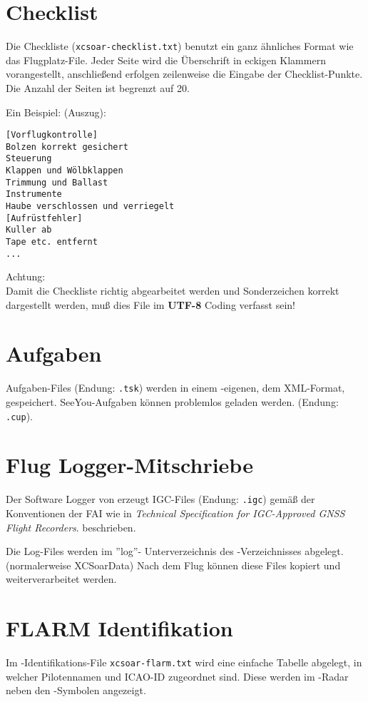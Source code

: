\section{Checklist}

Die Checkliste  (\verb|xcsoar-checklist.txt|) benutzt ein ganz ähnliches Format
wie das Flugplatz-File. 
Jeder Seite wird die Überschrift in eckigen Klammern vorangestellt, anschließend erfolgen
zeilenweise die Eingabe der Checklist-Punkte. Die Anzahl der Seiten ist begrenzt auf 20.

Ein Beispiel: (Auszug):
\begin{verbatim}
[Vorflugkontrolle]
Bolzen korrekt gesichert
Steuerung
Klappen und Wölbklappen
Trimmung und Ballast
Instrumente
Haube verschlossen und verriegelt
[Aufrüstfehler]
Kuller ab
Tape etc. entfernt
...
\end{verbatim}
 Achtung:\\ Damit die Checkliste richtig abgearbeitet werden und Sonderzeichen korrekt dargestellt werden, muß dies File \warning im \textbf{UTF-8} Coding verfasst sein!

\section{Aufgaben }

Aufgaben-Files  (Endung: \verb|.tsk|) werden in einem \xc -eigenen, dem  XML-Format, gespeichert.
SeeYou-Aufgaben können problemlos geladen werden. (Endung: \verb|.cup|).

\section{Flug Logger-Mitschriebe} \label{sec:logfiles}
Der Software Logger von \xc erzeugt  IGC-Files (Endung: \verb|.igc|)
gemäß der Konventionen der FAI wie in  {\em Technical Specification for IGC-Approved GNSS Flight Recorders}.
beschrieben.

Die Log-Files werden  im ''log''- Unterverzeichnis des \xc -Verzeichnisses abgelegt. (normalerweise XCSoarData)
Nach dem Flug können diese Files kopiert und weiterverarbeitet werden.

\section{FLARM Identifikation}\label{sec:flarm-ident-file}

Im  \fl-Identifikations-File  \verb|xcsoar-flarm.txt| wird eine einfache Tabelle
abgelegt, in welcher Pilotennamen und ICAO-ID zugeordnet sind.
Diese werden im \fl-Radar neben den \fl-Symbolen angezeigt.

